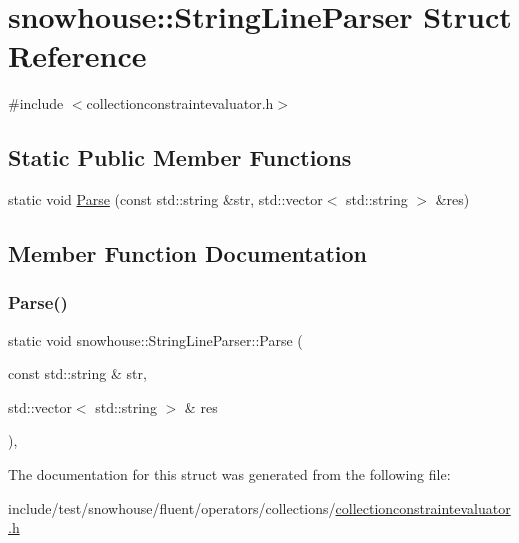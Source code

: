 \hypertarget{structsnowhouse_1_1StringLineParser}{}\section{snowhouse\+::String\+Line\+Parser Struct Reference}
\label{structsnowhouse_1_1StringLineParser}


{\ttfamily \#include $<$collectionconstraintevaluator.\+h$>$}

\subsection*{Static Public Member Functions}
\begin{DoxyCompactItemize}
\item 
static void \mbox{\hyperlink{structsnowhouse_1_1StringLineParser_a30bc11b0ef784f80b960ec3335cdacf6}{Parse}} (const std\+::string \&str, std\+::vector$<$ std\+::string $>$ \&res)
\end{DoxyCompactItemize}


\subsection{Member Function Documentation}
\mbox{\label{structsnowhouse_1_1StringLineParser_a30bc11b0ef784f80b960ec3335cdacf6}} 
\subsubsection{\texorpdfstring{Parse()}{Parse()}}
{\footnotesize\ttfamily static void snowhouse\+::\+String\+Line\+Parser\+::\+Parse (\begin{DoxyParamCaption}\item[{const std\+::string \&}]{str,  }\item[{std\+::vector$<$ std\+::string $>$ \&}]{res }\end{DoxyParamCaption})\hspace{0.3cm}{\ttfamily [inline]}, {\ttfamily [static]}}



The documentation for this struct was generated from the following file\+:\begin{DoxyCompactItemize}
\item 
include/test/snowhouse/fluent/operators/collections/\mbox{\hyperlink{collectionconstraintevaluator_8h}{collectionconstraintevaluator.\+h}}\end{DoxyCompactItemize}
